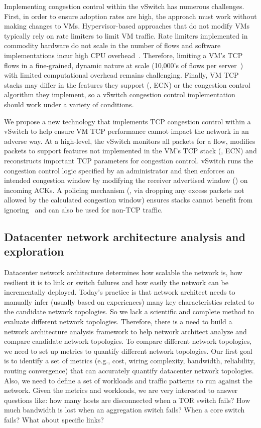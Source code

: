 Implementing congestion control within the vSwitch has numerous challenges. First, in order to ensure adoption rates are high, the
approach must work without making changes to VMs.
Hypervisor-based approaches that do not modify VMs typically rely on rate limiters to limit VM traffic. Rate limiters implemented in
commodity hardware do not scale in the number of flows and software implementations incur high CPU overhead~\cite{radhakrishnan2014senic}.
Therefore, limiting a VM's TCP flows in a fine-grained, dynamic nature
at scale (10,000's of flows per server~\cite{moshref2013vcrib}) with limited computational overhead remains challenging.
Finally, VM TCP stacks may differ in the features they support (\eg{}, ECN) or the congestion
control algorithm they implement, so a vSwitch congestion control implementation should work under a variety
of conditions.

We propose a new technology that implements
TCP congestion control within a vSwitch to help ensure VM
TCP performance cannot impact the network in an adverse way. At a high-level, the vSwitch monitors all packets for a flow, modifies
packets to support features not implemented in the VM's TCP stack (\eg{}, ECN) and reconstructs
important TCP parameters for congestion control. vSwitch runs the congestion control logic specified by an administrator and then enforces an intended
congestion window by modifying the receiver advertised window (\rwnd{}) on incoming ACKs. A policing
mechanism (\ie{}, via dropping any excess packets not allowed by the calculated congestion window) ensures stacks cannot benefit from ignoring~\rwnd{} and can also be used for non-TCP traffic.

\subsection{Datacenter network architecture analysis and exploration}

Datacenter network architecture determines how scalable the network is, 
how resilient it is to link or switch failures and how easily the network 
can be incrementally deployed. Today's practice is that network architect needs to 
manually infer (usually based on experiences) many key characteristics related to 
the candidate network topologies. So we lack a scientific and complete method to 
evaluate different network topologies. Therefore, there is a need to build a network 
architecture analysis framework to help network architect analyze and compare 
candidate network topologies. To compare different network topologies, we need to 
set up metrics to quantify different network topologies. Our first goal is to 
identify a set of metrics (e.g., cost, wiring complexity, bandwidth, reliability, routing convergence) that 
can accurately quantify datacenter network topologies.  Also, we need to define a set of workloads 
and traffic patterns to run against the network. Given the metrics and workloads, 
we are very interested to answer questions like: how many hosts are disconnected when 
a TOR switch fails? How much bandwidth is lost when an aggregation switch fails? 
When a core switch fails? What about specific links? 

